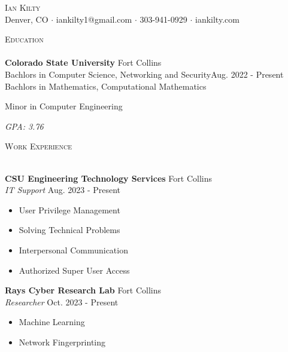 \documentclass[a4paper]{article}
\newcommand{\lineunder} {
    \vspace*{-8pt} \\
    \hspace*{-18pt} \hrulefill \\
}
\newcommand{\header} [1] {
    {\hspace*{-18pt}\vspace*{6pt} \textsc{#1}}
    \vspace*{-6pt} \lineunder
}
\begin{document}
\vspace*{-40pt}

    

\vspace*{-10pt}
\begin{center}
	{\Huge \scshape {Ian Kilty}}\\
	Denver, CO $\cdot$ iankilty1@gmail.com $\cdot$ 303-941-0929 $\cdot$ iankilty.com\\
\end{center}

\header{Education}
\textbf{Colorado State University}
\hfill Fort Collins\\

Bachlors in Computer Science, Networking and Security\hfill Aug. 2022 - Present\\

Bachlors in Mathematics, Computational Mathematics

Minor in Computer Engineering

\textit{GPA: 3.76}
\vspace{2mm}

\header{Work Experience}
\vspace{1mm}

\textbf{CSU Engineering Technology Services} \hfill Fort Collins\\
\textit{IT Support} \hfill Aug. 2023 - Present\\
\vspace{-1mm}
\begin{itemize} \itemsep 1pt
	\item User Privilege Management
	\item Solving Technical Problems
	\item Interpersonal Communication
	\item Authorized Super User Access
\end{itemize}

\textbf{Rays Cyber Research Lab} \hfill Fort Collins\\
\textit{Researcher} \hfill Oct. 2023 - Present\\
\vspace{-1mm}
\begin{itemize} \itemsep 1pt
	\item Machine Learning
	\item Network Fingerprinting
\end{itemize}
\end{document}
